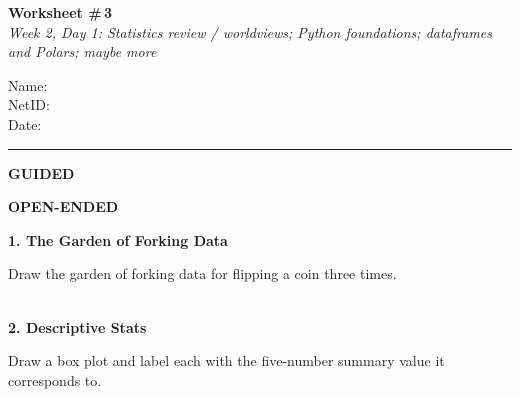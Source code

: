 \documentclass[11pt]{article}
\newcommand{\blankspace}[1]{%
  \vspace{0.3em}
  \begin{minipage}[t][#1][t]{\linewidth}
  \end{minipage}
  \vspace{0.3em}
}
\newcommand{\guidedopen}[4]{%
  \noindent\textbf{#1}\\[0.18em]
  \noindent
  \begin{minipage}[t]{0.485\textwidth}
    #2
    \blankspace{#3}
  \end{minipage}
  \hfill
  \begin{minipage}[t]{0.485\textwidth}
    \blankspace{#4}
  \end{minipage}
  \\[0.4em]
}
\begin{document}
\RaggedRight

\noindent
\begin{minipage}[t]{0.55\textwidth}
  \vspace{0pt}
  {\LARGE \textbf{Worksheet \#\,3}} \\[0.18em]
  {\large \textit{Week 2, Day 1: Statistics review / worldviews; Python foundations; dataframes and Polars; maybe more}}
\end{minipage}
\hfill
\begin{minipage}[t]{0.40\textwidth}
  \vspace{0pt}
  \small
  Name: \underline{\hspace{4.5cm}} \\[0.35em]
  NetID: \underline{\hspace{4.3cm}} \\[0.35em]
  Date: \underline{\hspace{4.4cm}} \\
\end{minipage}

\vspace{0.5em}
\noindent\rule{\linewidth}{0.6pt}
\vspace{0.5em}

\noindent
\begin{minipage}[t]{0.485\textwidth}
  \centering\small\textbf{GUIDED}
\end{minipage}
\hfill
\begin{minipage}[t]{0.485\textwidth}
  \centering\small\textbf{OPEN-ENDED}
\end{minipage}

\vspace{0.2em}

\guidedopen{1. The Garden of Forking Data}{
Draw the garden of forking data for flipping a coin three times.
}{5.2cm}{6.3cm}

\guidedopen{2. Descriptive Stats}{
Draw a box plot and label each with the five-number summary value it corresponds to.
}{5.2cm}{6.5cm}

\newpage
\end{document}
